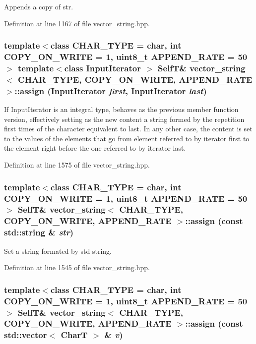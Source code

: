 Appends a copy of str. 

Definition at line 1167 of file vector\_\-string.hpp.\hypertarget{classvector__string_763bc15c22982c7fa76f1419e67d53b5}{
\subsubsection[{assign}]{\setlength{\rightskip}{0pt plus 5cm}template$<$class CHAR\_\-TYPE  = char, int COPY\_\-ON\_\-WRITE = 1, uint8\_\-t APPEND\_\-RATE = 50$>$ template$<$class InputIterator $>$ {\bf SelfT}\& {\bf vector\_\-string}$<$ CHAR\_\-TYPE, COPY\_\-ON\_\-WRITE, APPEND\_\-RATE $>$::assign (InputIterator {\em first}, \/  InputIterator {\em last})}}
\label{classvector__string_763bc15c22982c7fa76f1419e67d53b5}


If InputIterator is an integral type, behaves as the previous member function version, effectively setting as the new content a string formed by the repetition first times of the character equivalent to last. In any other case, the content is set to the values of the elements that go from element referred to by iterator first to the element right before the one referred to by iterator last. 

Definition at line 1575 of file vector\_\-string.hpp.\hypertarget{classvector__string_945a71bc52a850219f28f7c19afd2a13}{
\subsubsection[{assign}]{\setlength{\rightskip}{0pt plus 5cm}template$<$class CHAR\_\-TYPE  = char, int COPY\_\-ON\_\-WRITE = 1, uint8\_\-t APPEND\_\-RATE = 50$>$ {\bf SelfT}\& {\bf vector\_\-string}$<$ CHAR\_\-TYPE, COPY\_\-ON\_\-WRITE, APPEND\_\-RATE $>$::assign (const std::string \& {\em str})}}
\label{classvector__string_945a71bc52a850219f28f7c19afd2a13}


Set a string formated by std string. 

Definition at line 1545 of file vector\_\-string.hpp.\hypertarget{classvector__string_afc4812e811663b17b6239b7ae2343e3}{
\subsubsection[{assign}]{\setlength{\rightskip}{0pt plus 5cm}template$<$class CHAR\_\-TYPE  = char, int COPY\_\-ON\_\-WRITE = 1, uint8\_\-t APPEND\_\-RATE = 50$>$ {\bf SelfT}\& {\bf vector\_\-string}$<$ CHAR\_\-TYPE, COPY\_\-ON\_\-WRITE, APPEND\_\-RATE $>$::assign (const std::vector$<$ CharT $>$ \& {\em v})}}
\label{classvector__string_afc4812e811663b17b6239b7ae2343e3}


